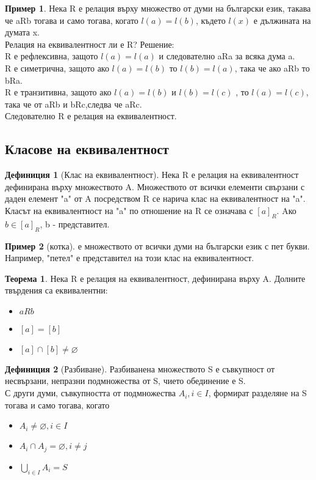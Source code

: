\documentclass[fleqn, 12pt]{article}
\theoremstyle{definition}
\newtheorem{example}{Пример}[subsection]
\newtheorem{definition}{Дефиниция}[subsection]
\newtheorem{theorem}{Теорема}[subsection]
\begin{document}
\begin{example}
Нека R е релация върху множество от думи на български език, такава че aRb тогава и само тогава, когато $l(a) = l(b)$, където $l(x)$ е дължината на думата x.\\
Релация на еквивалентност ли е R?
Решение: \\
R е рефлексивна, защото $l(a) = l(a)$ и следователно aRa за всяка дума a.\\
R е симетрична, защото ако $l(a) = l(b)$ то $l(b) = l(a)$, така че ако aRb то bRa.\\
R е транзитивна, защото ако $l(a) = l(b)$ и $l(b) = l(c)$ , то $l(a) = l(c)$, така че от aRb и bRc,следва че aRc.\\
Следователно R е релация на еквивалентност.
\end{example}

\subsection{Класове на еквивалентност}

\begin{definition}[Клас на еквивалентност]
Нека R е релация на еквивалентност дефинирана върху множеството A. Множеството от всички елементи свързани с даден елемент "a"\! от A посредством R се нарича клас на еквивалентност на "a". \\
Класът на еквивалентност на "a" \! по отношение на R се означава с $[a]_R$.
Aко $b \in [a]_R$, b - представител.
\end{definition}

\begin{example}
[котка] е множеството от всички думи на български език с пет букви. Например, "петел" е представител на този клас на еквивалентност.
\end{example}

\begin{theorem}
Нека R е релация на еквивалентност, дефинирана върху A. Долните твърдения са еквивалентни:
\begin{itemize}
\item $aRb$
\item $[a] = [b]$
\item $[a] \cap [b] \neq \varnothing$
\end{itemize}
\end{theorem}

\begin{definition}[Разбиване]
Разбиванена множеството S е съвкупност от несвързани, непразни подмножества от S, чието обединение е S. \\
С други думи, съвкупността от подмножества $A_i, i\in I$, формират разделяне на S тогава и само тогава, когато

\begin{itemize}
\item $A_i \neq \varnothing, i \in I$
\item $A_i \cap A_j = \varnothing, i \neq j$
\item $\bigcup_{i \in I} A_i = S$
\end{itemize}

\end{definition}
\end{document}
